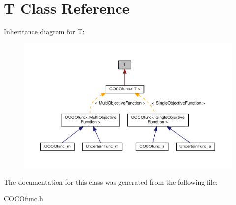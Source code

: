\hypertarget{classT}{}\section{T Class Reference}
\label{classT}


Inheritance diagram for T\+:\nopagebreak
\begin{figure}[H]
\begin{center}
\leavevmode
\includegraphics[width=350pt]{classT__inherit__graph}
\end{center}
\end{figure}


The documentation for this class was generated from the following file\+:\begin{DoxyCompactItemize}
\item 
C\+O\+C\+Ofunc.\+h\end{DoxyCompactItemize}
